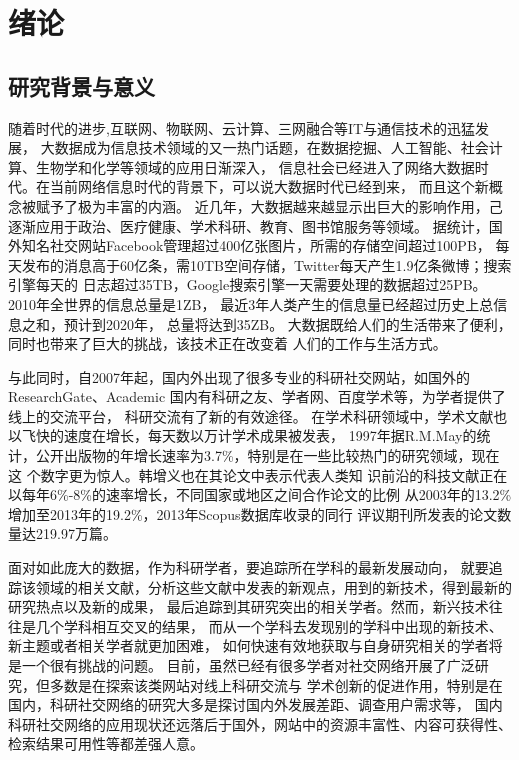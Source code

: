﻿\chapter{绪论}
\section{研究背景与意义}
随着时代的进步,互联网、物联网、云计算、三网融合等IT与通信技术的迅猛发展，%
大数据成为信息技术领域的又一热门话题，在数据挖掘、人工智能、社会计算、生物学和化学等领域的应用日渐深入，%
信息社会已经进入了网络大数据时代。在当前网络信息时代的背景下，可以说大数据时代已经到来，%
而且这个新概念被赋予了极为丰富的内涵。%
近几年，大数据越来越显示出巨大的影响作用，己逐渐应用于政治、医疗健康、学术科研、教育、图书馆服务等领域。
据统计，国外知名社交网站Facebook管理超过400亿张图片，所需的存储空间超过100PB，%
每天发布的消息高于60亿条，需10TB空间存储，Twitter每天产生1.9亿条微博；搜索引擎每天的%
日志超过35TB，Google搜索引擎一天需要处理的数据超过25PB。2010年全世界的信息总量是1ZB，%
最近3年人类产生的信息量已经超过历史上总信息之和，预计到2020年，%
总量将达到35ZB。%
大数据既给人们的生活带来了便利，同时也带来了巨大的挑战，该技术正在改变着%
人们的工作与生活方式。%

与此同时，自2007年起，国内外出现了很多专业的科研社交网站，如国外的ResearchGate、Academic%
国内有科研之友、学者网、百度学术等，为学者提供了线上的交流平台，%
科研交流有了新的有效途径。
在学术科研领域中，学术文献也以飞快的速度在增长，每天数以万计学术成果被发表，
1997年据R.M.May的统计，公开出版物的年增长速率为3.7\%，特别是在一些比较热门的研究领域，现在这
个数字更为惊人。韩增义也在其论文中表示代表人类知%
识前沿的科技文献正在以每年6\%-8\%的速率增长，不同国家或地区之间合作论文的比例%
从2003年的13.2\%增加至2013年的19.2\%，2013年Scopus数据库收录的同行%
评议期刊所发表的论文数量达219.97万篇。%

面对如此庞大的数据，作为科研学者，要追踪所在学科的最新发展动向，%
就要追踪该领域的相关文献，分析这些文献中发表的新观点，用到的新技术，得到最新的研究热点以及新的成果，%
最后追踪到其研究突出的相关学者。然而，新兴技术往往是几个学科相互交叉的结果，%
而从一个学科去发现别的学科中出现的新技术、新主题或者相关学者就更加困难，%
如何快速有效地获取与自身研究相关的学者将是一个很有挑战的问题。%
目前，虽然已经有很多学者对社交网络开展了广泛研究，但多数是在探索该类网站对线上科研交流与%
学术创新的促进作用，特别是在国内，科研社交网络的研究大多是探讨国内外发展差距、调查用户需求等，%
国内科研社交网络的应用现状还远落后于国外，网站中的资源丰富性、内容可获得性、%
检索结果可用性等都差强人意。

